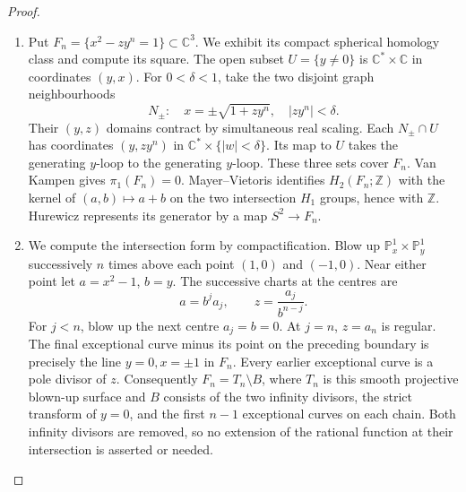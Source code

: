 \begin{proof}

\begin{enumerate}[label={$\langle1\rangle$\arabic*.},leftmargin=*]
\item Put $F_n=\{x^2-zy^n=1\}\subset\mathbb C^3$. We exhibit its
compact spherical homology class and compute its square.
The open subset $U=\{y\ne0\}$ is
$\mathbb C^*\times\mathbb C$ in coordinates $(y,x)$.
For $0<\delta<1$, take the two disjoint graph neighbourhoods
\[
 N_\pm:\quad x=\pm\sqrt{1+zy^n},\quad |zy^n|<\delta.
\]
Their $(y,z)$ domains contract by simultaneous real scaling.
Each $N_\pm\cap U$ has coordinates $(y,zy^n)$ in
$\mathbb C^*\times\{|w|<\delta\}$. Its map to $U$ takes
the generating $y$-loop to the generating $y$-loop. These three
sets cover $F_n$. Van Kampen gives $\pi_1(F_n)=0$.
Mayer--Vietoris identifies $H_2(F_n;\mathbb Z)$ with the
kernel of $(a,b)\mapsto a+b$ on the two intersection
$H_1$ groups, hence with $\mathbb Z$. Hurewicz represents its
generator by a map $S^2\to F_n$.

\item We compute the intersection form by compactification. Blow up
$\mathbb P^1_x\times\mathbb P^1_y$ successively $n$ times above
each point $(1,0)$ and $(-1,0)$. Near either point let
$a=x^2-1$, $b=y$. The successive charts at the centres are
\[
 a=b^j a_j,\qquad z=\frac{a_j}{b^{n-j}}.
\]
For $j<n$, blow up the next centre $a_j=b=0$.
At $j=n$, $z=a_n$ is regular. The final exceptional curve
minus its point on the preceding boundary is precisely the
line $y=0,x=\pm1$ in $F_n$. Every earlier exceptional curve
is a pole divisor of $z$. Consequently $F_n=T_n\setminus B$,
where $T_n$ is this smooth projective blown-up surface and
$B$ consists of the two infinity divisors, the strict transform
of $y=0$, and the first $n-1$ exceptional curves on each chain.
Both infinity divisors are removed, so no extension of the
rational function at their intersection is asserted or needed.


\end{enumerate}
\end{proof}
